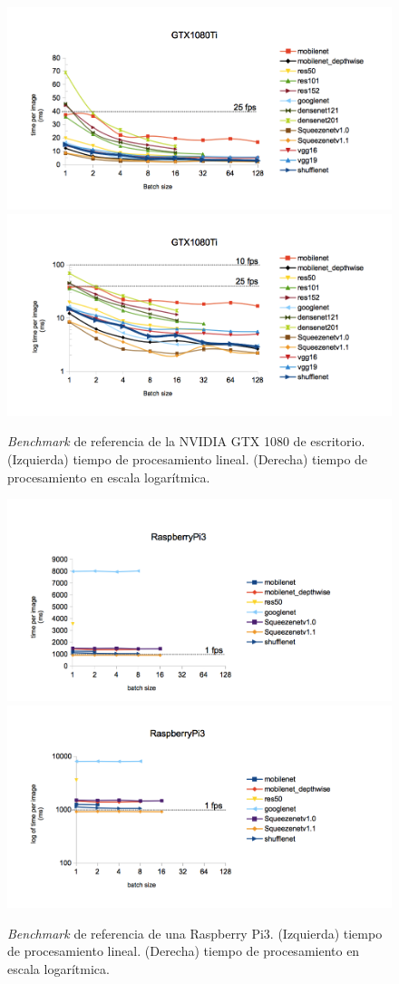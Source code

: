 \begin{figure}[htp]
    \centering
    \captionsetup{justification=centering}
    \includegraphics[width=.5\textwidth]{img/gtx1080_linear.png}\hfill
    \includegraphics[width=.5\textwidth]{img/gtx1080_log.png}
    \caption{\textit{Benchmark} de referencia de la NVIDIA GTX 1080 de escritorio. (Izquierda) tiempo de procesamiento lineal. (Derecha) tiempo de procesamiento en escala logarítmica.}
    \label{fig:ben_gtx}
\end{figure}

\begin{figure}[htp]
    \centering
    \captionsetup{justification=centering}
    \includegraphics[width=.5\textwidth]{img/Raspi_linear.png}\hfill
    \includegraphics[width=.5\textwidth]{img/Raspi_log.png}
    \caption{\textit{Benchmark} de referencia de una Raspberry Pi3. (Izquierda) tiempo de procesamiento lineal. (Derecha) tiempo de procesamiento en escala logarítmica.}
    \label{fig:ben_pi}
\end{figure}

